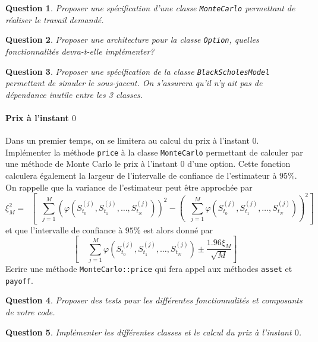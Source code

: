 \documentclass[a4paper,11pt]{article}
\def\inv#1{\mathop{\frac{1}{ #1}}\nolimits}
\def\expp#1{\mathop {\mathrm{e}^{ #1}}}
\def\var#1{{\tt #1}}
\newtheorem{question}{Question}
\begin{document}
\begin{question}
  Proposer une spécification d'une classe \verb!MonteCarlo! permettant de réaliser le travail demandé.
\end{question}

\begin{question}
  Proposer une architecture pour la classe \verb!Option!, quelles fonctionnalités devra-t-elle implémenter?
\end{question}

\begin{question}
  Proposer une spécification de la classe \verb!BlackScholesModel! permettant de simuler le sous-jacent. On s'assurera qu'il n'y ait pas de dépendance inutile entre les 3 classes.
\end{question}


\paragraph{Prix à l'instant $0$}

Dans un premier temps, on se limitera au calcul du prix à l'instant $0$.  Implémenter la méthode \var{price} à la classe \var{MonteCarlo} permettant de calculer par une méthode de Monte Carlo le prix à l'instant $0$ d'une option.  Cette fonction calculera également la largeur de l'intervalle de confiance de l'estimateur à $95\%$. On rappelle que la variance de l'estimateur peut être approchée par
\begin{equation*}
  \xi_M^2 = \expp{-2rT} \left[\inv{M} \sum_{j=1}^M (\varphi(S_{t_0}^{(j)},
  S_{t_1}^{(j)}, \dots, S_{t_N}^{(j)}))^2 - \left(\inv{M} \sum_{j=1}^M
  \varphi(S_{t_0}^{(j)}, S_{t_1}^{(j)}, \dots, S_{t_N}^{(j)}) \right)^2 \right]
\end{equation*}
et que l'intervalle de confiance à $95\%$ est alors donné par
\begin{equation*}
  \left[\expp{-rT} \inv{M} \sum_{j=1}^M \varphi(S_{t_0}^{(j)}, S_{t_1}^{(j)}, \dots,
  S_{t_N}^{(j)}) \pm \frac{1.96 \xi_M}{\sqrt{M}} \right]
\end{equation*}
Ecrire une méthode \var{MonteCarlo::price} qui fera appel aux méthodes \var{asset} et
\var{payoff}.

\begin{question}
  Proposer des tests pour les différentes fonctionnalités et composants de votre code.
\end{question}

\begin{question}
  Implémenter les différentes classes et le calcul du prix à l'instant $0$.
\end{question}
\end{document}
